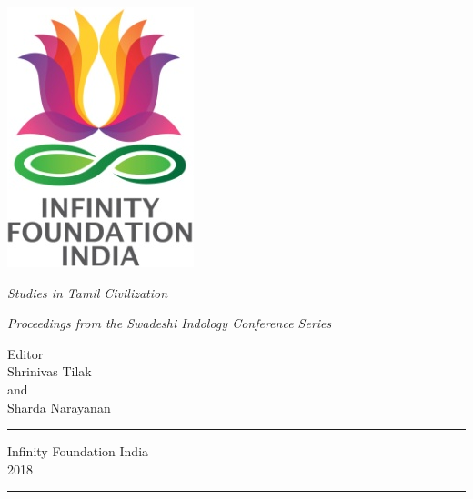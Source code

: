 \thispagestyle{empty}
\begin{center}
\includegraphics[scale=0.3]{images/logo.png}
\bigskip

{\fontsize{10}{14}\selectfont\sl
Studies in Tamil Civilization
}

\bigskip
\end{center}
\medskip

\begin{center}
{\fontsize{20}{24}\selectfont {L\,a\,n\,d\;\; o\,f\;\; D\,h\,a\,r\,m\,a}}
\bigskip

{\sl\small Proceedings from the Swadeshi Indology Conference Series}
\vfill


{\fontsize{14}{18}\selectfont 
Editor\\[2pt]
Shrinivas Tilak\\ 
and\\ 
Sharda Narayanan\par
}
\vfill

\rule{5cm}{1pt}

{\fontsize{12}{14}\selectfont
Infinity Foundation India\\[4pt]
2018}

\rule{5cm}{1pt}
\end{center}




